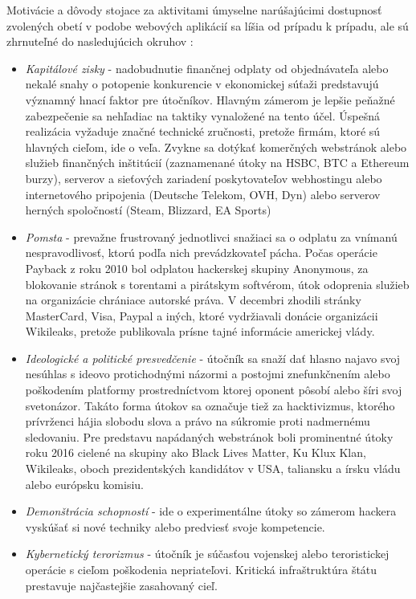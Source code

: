 \documentclass[12pt, a4paper]{article}
\begin{document}
Motivácie a dôvody stojace za aktivitami úmyselne narúšajúcimi dostupnosť zvolených obetí v podobe
webových aplikácií sa líšia od prípadu k prípadu, ale sú zhrnuteľné do nasledujúcich okruhov 
\cite{why-attack} \cite{ddos-attacks}:
\begin{itemize}
\itemsep0em 
\item \emph{Kapitálové zisky} - nadobudnutie finančnej odplaty od objednávateľa alebo nekalé snahy o 
potopenie konkurencie v ekonomickej súťaži predstavujú významný hnací faktor pre útočníkov. 
Hlavným zámerom je lepšie peňažné zabezpečenie sa nehľadiac na taktiky vynaložené na tento účel. 
Úspešná realizácia vyžaduje značné technické zručnosti, pretože firmám, ktoré sú hlavných cieľom,
ide o veľa. Zvykne sa dotýkať komerčných webstránok alebo služieb finančných inštitúcií (zaznamenané útoky 
na HSBC, BTC a Ethereum burzy), serverov a sieťových zariadení poskytovateľov webhostingu alebo 
internetového pripojenia (Deutsche Telekom, OVH, Dyn) alebo serverov herných spoločností (Steam, Blizzard, 
EA Sports) \cite{why-attack}

\item \emph{Pomsta} - prevažne frustrovaný jednotlivci snažiaci sa o odplatu za vnímanú 
nespravodlivosť, ktorú podľa nich prevádzkovateľ pácha. Počas operácie Payback z roku 2010 bol odplatou
hackerskej skupiny Anonymous, za blokovanie stránok s torentami a pirátskym softvérom, útok odoprenia 
služieb na organizácie chrániace autorské práva. V decembri zhodili stránky MasterCard, Visa, Paypal a 
iných, ktoré vydržiavali donácie organizácii Wikileaks, pretože publikovala prísne tajné informácie
americkej vlády.

\item \emph{Ideologické a politické presvedčenie} - útočník sa snaží dať hlasno najavo svoj nesúhlas s 
ideovo protichodnými názormi a postojmi znefunkčnením alebo poškodením platformy prostredníctvom ktorej 
oponent pôsobí alebo šíri svoj svetonázor. Takáto forma útokov sa označuje tiež za hacktivizmus, ktorého 
prívrženci hájia slobodu slova a právo na súkromie proti nadmernému sledovaniu. Pre predstavu napádaných 
webstránok boli prominentné útoky roku 2016 cielené na skupiny ako Black Lives Matter, Ku Klux Klan, 
Wikileaks, oboch prezidentských kandidátov v USA, taliansku a írsku vládu alebo európsku komisiu. 
\cite{why-attack}

\item \emph{Demonštrácia schopností} - ide o experimentálne útoky so zámerom hackera vyskúšať si nové 
techniky alebo predviesť svoje kompetencie.
 
\item\emph{Kybernetický terorizmus} - útočník je súčasťou vojenskej alebo teroristickej operácie s cieľom
poškodenia nepriateľovi. Kritická infraštruktúra štátu prestavuje najčastejšie zasahovaný cieľ.
\end{itemize}
\end{document}
